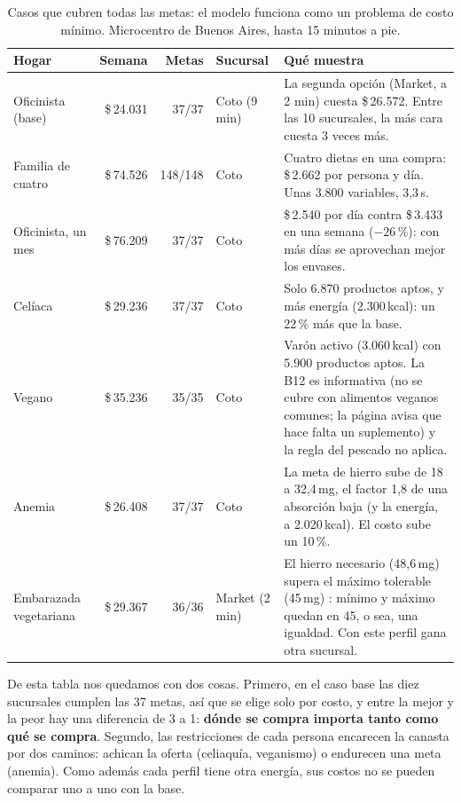 \documentclass[10pt,a4paper]{article}
\newcommand{\pesos}[1]{\$\,#1}
\begin{document}
\begin{table}[H]
\centering\small
\caption{Casos que cubren todas las metas: el modelo funciona como un problema de
costo mínimo. Microcentro de Buenos Aires, hasta 15 minutos a pie.}
\label{tab:cumplen}
\renewcommand{\arraystretch}{1.2}
\begin{tabularx}{\linewidth}{@{}lrrlX@{}}
\toprule
\textbf{Hogar} & \textbf{Semana} & \textbf{Metas} & \textbf{Sucursal} & \textbf{Qué muestra} \\
\midrule
Oficinista (base)     & \pesos{24.031} & 37/37   & Coto (9 min)   & La segunda opción (Market, a 2 min) cuesta \pesos{26.572}. Entre las 10 sucursales, la más cara cuesta 3 veces más. \\
Familia de cuatro     & \pesos{74.526} & 148/148 & Coto           & Cuatro dietas en una compra: \pesos{2.662} por persona y día. Unas 3.800 variables, 3,3\,s. \\
Oficinista, un mes    & \pesos{76.209} & 37/37   & Coto           & \pesos{2.540} por día contra \pesos{3.433} en una semana ($-26\,\%$): con más días se aprovechan mejor los envases. \\
Celíaca               & \pesos{29.236} & 37/37   & Coto           & Solo 6.870 productos aptos, y más energía (2.300\,kcal): un 22\,\% más que la base. \\
Vegano                & \pesos{35.236} & 35/35   & Coto           & Varón activo (3.060\,kcal) con 5.900 productos aptos. La B12 es informativa \cite{dri} (no se cubre con alimentos veganos comunes; la página avisa que hace falta un suplemento) y la regla del pescado no aplica. \\
Anemia                & \pesos{26.408} & 37/37   & Coto           & La meta de hierro sube de 18 a 32,4\,mg, el factor 1,8 de una absorción baja \cite{dri} (y la energía, a 2.020\,kcal). El costo sube un 10\,\%. \\
Embarazada vegetariana & \pesos{29.367} & 36/36  & Market (2 min) & El hierro necesario (48,6\,mg) supera el máximo tolerable (45\,mg) \cite{dri}: mínimo y máximo quedan en 45, o sea, una igualdad. Con este perfil gana otra sucursal. \\
\bottomrule
\end{tabularx}
\end{table}

De esta tabla nos quedamos con dos cosas. Primero, en el caso base las diez
sucursales cumplen las 37 metas, así que se elige solo por costo, y entre la mejor y
la peor hay una diferencia de 3 a 1: \textbf{dónde se compra importa tanto como qué
se compra}. Segundo, las restricciones de cada persona encarecen la canasta por dos
caminos: achican la oferta (celiaquía, veganismo) o endurecen una meta (anemia).
Como además cada perfil tiene otra energía, sus costos no se pueden comparar uno a
uno con la base.
\end{document}
